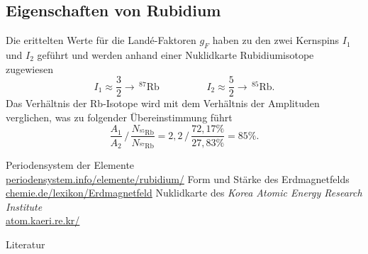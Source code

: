 \subsection{Eigenschaften von Rubidium}
Die erittelten Werte für die Landé-Faktoren $g_F$ haben zu den zwei Kernspins $I_1$ und $I_2$ geführt und werden anhand einer Nuklidkarte \cite{Spin} Rubidiumisotope
zugewiesen
\begin{equation}
 I_1 \approx \frac32 \rightarrow\, ^{87}\text{Rb} \hspace{2cm} I_2 \approx \frac52 \rightarrow\, ^{85}\text{Rb}.
\end{equation}
Das Verhältnis der Rb-Isotope \cite{Spin} wird mit dem Verhältnis der Amplituden verglichen, was zu folgender Übereinstimmung führt
\begin{equation}
 \frac{A_1}{A_2}\, /\, \frac{N_{^{85}\text{Rb}}}{N_{^{87}\text{Rb}}} = 2,2 \,/\, \frac{72,17\%}{27,83\%} =85\% .
\end{equation}



\begin{thebibliography}{xxxxxxxxxxx}
 Periodensystem der Elemente\\ \href{http://www.periodensystem.info/elemente/rubidium/}{periodensystem.info/elemente/rubidium/}
 Form und Stärke des Erdmagnetfelds\\ \href{http://www.chemie.de/lexikon/Erdmagnetfeld.html#Form_und_St.C3.A4rke_des_Erdmagnetfeldes}{chemie.de/lexikon/Erdmagnetfeld}
 Nuklidkarte des \textit{Korea Atomic Energy Research Institute}\\ \href{http://atom.kaeri.re.kr/}{atom.kaeri.re.kr/}
\end{thebibliography}



\parskip 340pt
\Large{Literatur}\\\\





